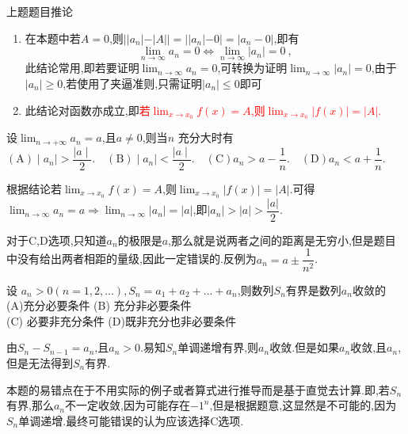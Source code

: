 \documentclass[8pt a4paper, oneside, UTF8]{ctexbook}
\begin{document}
\begin{sloppypar}
\begin{corollary}{上题题目推论}{}
\begin{enumerate}
            \item 在本题中若$A=0$,则$||a_n|-|A||=||a_n|-0|=|a_n-0|$,即有
                  $$
                      \lim_{n\to\infty}a_{n}=0\Leftrightarrow\lim_{n\to\infty}\lvert a_{n}\rvert=0\:,
                  $$
                  此结论常用,即若要证明$\lim _{n \to \infty}a_n=0$,可转换为证明$\lim_{n \to \infty}|a_n|=0$,由于$|a_n| \geq 0$,若使用了夹逼准则,只需证明$|a_n|\leqslant 0$即可
            \item 此结论对函数亦成立,即\textcolor{red}{若$\lim_{x\to x_0 }f\left(x\right)=A$,则$\lim_{x\to x_0}\left|f\left(x\right)\right|=\left|A\right|.$}
        \end{enumerate}
    \end{corollary}
    \begin{problem}
    设$\lim_{n \to +\infty} a_n=a$,且$a\neq0$,则当$n$ 充分大时有\\
    $\mathrm{(A)}\mid a_n\mid>\dfrac{\mid a\mid}{2}.\quad\mathrm{(B)}\mid a_n\mid<\dfrac{\mid a\mid}{2}.\quad\mathrm{(C)}a_n>a-\dfrac{1}{n}.\quad\mathrm{(D)}a_n<a+\dfrac{1}{n}.$
    \end{problem}
    \begin{solution}
        根据结论若$\lim_{x\to x_0 }f\left(x\right)=A$,则$\lim_{x\to x_0}\left|f\left(x\right)\right|=\left|A\right|.$可得$\lim_{n \to \infty}a_n=a \Rightarrow \lim_{n \to \infty}|a_n|=|a|$,即$|a_n|>|a| > \dfrac{|a|}{2}$.
    \end{solution}
    \begin{note}
        对于C,D选项,只知道$a_n$的极限是$a$,那么就是说两者之间的距离是无穷小,但是题目中没有给出两者相距的量级,因此一定错误的.反例为$a_n= a \pm \dfrac{1}{n^2}$.\label{pro3}
    \end{note}
    \begin{problem}
    设 $a_n>0(n=1,2,...),S_n=a_1+a_2+...+a_n$,则数列${S_n}$有界是数列${a_n}$收敛的\\
    (A)充分必要条件 \quad (B) 充分非必要条件\\
    (C) 必要非充分条件 \quad (D)既非充分也非必要条件
    \end{problem}
    \begin{solution}
        由$S_n-S_{n-1}=a_n$,且$a_n>0$.易知$S_n$单调递增有界,则$a_n$收敛.但是如果$a_n$收敛,且$a_n$,但是无法得到$S_n$有界.
    \end{solution}
    \begin{note}
        本题的易错点在于不用实际的例子或者算式进行推导而是基于直觉去计算.即,若$S_n$有界,那么$a_n$不一定收敛,因为可能存在$-1^n$,但是根据题意,这显然是不可能的,因为$S_n$单调递增.最终可能错误的认为应该选择C选项.

\end{note}
\end{sloppypar}
\end{document}
